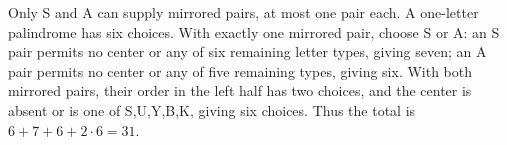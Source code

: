 Only S and A can supply mirrored pairs, at most one pair each. A one-letter palindrome has six choices. With exactly one mirrored pair, choose S or A: an S pair permits no center or any of six remaining letter types, giving seven; an A pair permits no center or any of five remaining types, giving six. With both mirrored pairs, their order in the left half has two choices, and the center is absent or is one of S,U,Y,B,K, giving six choices. Thus the total is $6+7+6+2\cdot6=\boxed{31}$.
